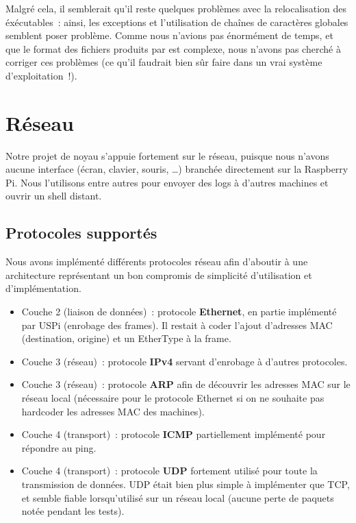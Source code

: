\documentclass[11pt,a4paper]{article}
\begin{document}
Malgré cela, il semblerait qu'il reste quelques problèmes avec la
relocalisation des éxécutables~: ainsi, les exceptions et
l'utilisation de chaînes de caractères globales semblent poser
problème. Comme nous n'avions pas énormément de temps, et que le
format des fichiers produits par  est complexe, nous
n'avons pas cherché à corriger ces problèmes (ce qu'il faudrait bien
sûr faire dans un vrai système d'exploitation~!).

\section{Réseau}
Notre projet de noyau s'appuie fortement sur le réseau, puisque nous n'avons
aucune interface (écran, clavier, souris, \ldots) branchée directement sur la
Raspberry Pi. Nous l'utilisons entre autres pour envoyer des logs
à d'autres machines et ouvrir un shell distant.

\subsection{Protocoles supportés}
Nous avons implémenté différents protocoles réseau afin d'aboutir à une
architecture représentant un bon compromis de simplicité d'utilisation
et d'implémentation.
\begin{itemize}
	\item Couche 2 (liaison de données)~: protocole \textbf{Ethernet}, en partie
		implémenté par USPi (enrobage des frames). Il restait à coder
		l'ajout d'adresses MAC (destination, origine) et un EtherType à la
		frame.
	\item Couche 3 (réseau)~: protocole \textbf{IPv4} servant d'enrobage à
		d'autres protocoles.
	\item Couche 3 (réseau)~: protocole \textbf{ARP} afin de découvrir les
		adresses MAC sur le réseau local (nécessaire pour le protocole
		Ethernet si on ne souhaite pas hardcoder les adresses MAC des
		machines).
	\item Couche 4 (transport)~: protocole \textbf{ICMP} partiellement
		implémenté pour répondre au ping.
	\item Couche 4 (transport)~: protocole \textbf{UDP} fortement utilisé
		pour toute la transmission de données. UDP était bien plus simple à
		implémenter que TCP, et semble fiable lorsqu'utilisé sur un réseau
		local (aucune perte de paquets notée pendant les tests).
\end{itemize}
\end{document}
